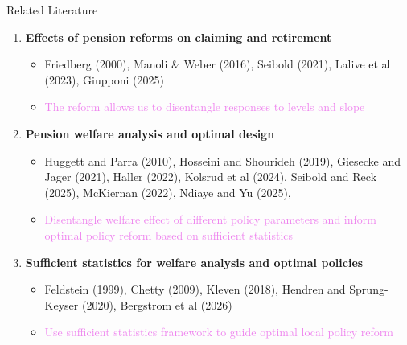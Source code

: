 \begin{frame}[label=literature]{Related Literature}
\begin{enumerate}
    \item \textbf{Effects of pension reforms on claiming and retirement}
    \vspace{0.3em}

    \begin{itemize}
        \item Friedberg (2000), Manoli \& Weber (2016), Seibold (2021), Lalive et al (2023),  Giupponi (2025)
        \vspace{0.3em}
        \item[\textcolor{violet}{$\rightarrow$}] \textcolor{violet}{The reform allows us to disentangle responses to levels and slope}

    \end{itemize}

    \vspace{0.3em}

    \item \textbf{Pension welfare analysis and optimal design}
    \vspace{0.3em}

    \begin{itemize}
         \item Huggett and Parra (2010), Hosseini and Shourideh (2019), Giesecke and Jager (2021), Haller (2022), Kolsrud et al (2024), Seibold and Reck (2025), McKiernan (2022), Ndiaye and Yu (2025),
        \item[\textcolor{violet}{$\rightarrow$}] \textcolor{violet}{Disentangle welfare effect of different policy parameters and inform optimal policy reform based on sufficient statistics}
    \end{itemize}
    \item \textbf{Sufficient statistics for welfare analysis and optimal policies}
    \vspace{0.3em}
    \begin{itemize}
        \item Feldstein (1999), Chetty (2009), Kleven (2018), Hendren and Sprung-Keyser (2020), Bergstrom et al (2026)
        \item[\textcolor{violet}{$\rightarrow$}] \textcolor{violet}{Use sufficient statistics framework to guide optimal local policy reform}
    \end{itemize}
\end{enumerate}
\end{frame}

